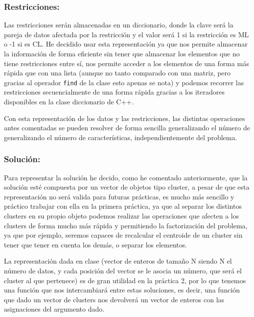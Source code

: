 \documentclass[12pt, spanish]{article}
\begin{document}
\subsubsection{Restricciones:}

Las restricciones serán almacenadas en un diccionario, donde la clave será la pareja de datos afectada por la restricción y el valor será 1 si la restricción es ML o -1 si es CL. He decidido usar esta representación ya que nos permite almacenar la información de forma eficiente sin tener que almacenar los elementos que no tiene restricciones entre sí, nos permite acceder a los elementos de una forma más rápida que con una lista (aunque no tanto comparado con una matriz, pero gracias al operador \texttt{find} de la clase esto apenas se nota) y podemos recorrer las restricciones secuencialmente de una forma rápida gracias a los iteradores disponibles en la clase diccionario de C++.


Con esta representación de los datos y las restricciones, las distintas operaciones antes comentadas se pueden resolver de forma sencilla generalizando el número de generalizando el número de características, independientemente del problema.


\subsubsection{Solución:}

Para representar la solución he decido, como he comentado anteriormente, que la solución esté compuesta por un vector de objetos tipo cluster, a pesar de que esta representación no será valida para futuras prácticas, es mucho más sencillo y práctico trabajar con ella en la primera práctica, ya que al separar los distintos clusters en su propio objeto podemos realizar las operaciones que afecten a los clusters de forma mucho más rápida y permitiendo la factorización del problema, ya que por ejemplo, seremos capaces de recalcular el centroide de un cluster sin tener que tener en cuenta los demás, o separar los elementos.

La representación dada en clase (vector de enteros de tamaño N siendo N el número de datos, y cada posición del vector se le asocia un número, que será el cluster al que pertenece) es de gran utilidad en la práctica 2, por lo que tenemos una función que nos intercambiará entre estas soluciones, es decir, una función que dado un vector de clusters nos devolverá un vector de enteros con las asignaciones del argumento dado.
\end{document}
